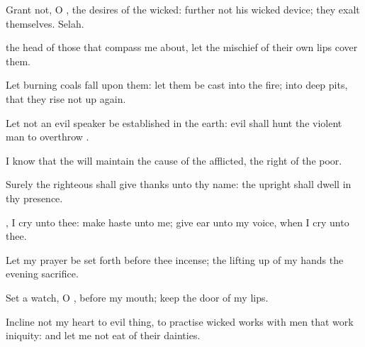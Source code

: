 {\Q {}Grant not, O
{}, the
desires of the
wicked:
further not his wicked
device;
{} they
exalt themselves.
Selah.


\par }{\Q {} the
head of those that compass me
about, let the
mischief of their own
lips
cover them.


\par }{\Q {}Let burning
coals
fall upon them: let them be
cast into the
fire; into deep
pits, that they rise not up
again.


\par }{\Q {}Let not an evil
speaker be
established in the
earth:
evil shall
hunt the
violent
man to
overthrow
{}.


\par }{\Q {}I
know that the
{} will
maintain the
cause of the
afflicted,
{} the
right of the
poor.


\par }{\Q {}Surely the
righteous shall give
thanks unto thy
name: the
upright shall
dwell in thy
presence.




\par }
{\Q {}, I
cry unto thee: make
haste unto me; give
ear unto my
voice, when I
cry unto thee.


\par }{\Q {}Let my
prayer be set
forth
before thee
{}
incense;
{} the lifting
up of my
hands
{} the
evening
sacrifice.


\par }{\Q {}Set a
watch, O
{}, before my
mouth;
keep the
door of my
lips.


\par }{\Q {}Incline not my
heart to
{}
evil
thing, to
practise
wicked
works with
men that
work
iniquity: and let me not
eat of their
dainties.


\par }{\BB \par }
